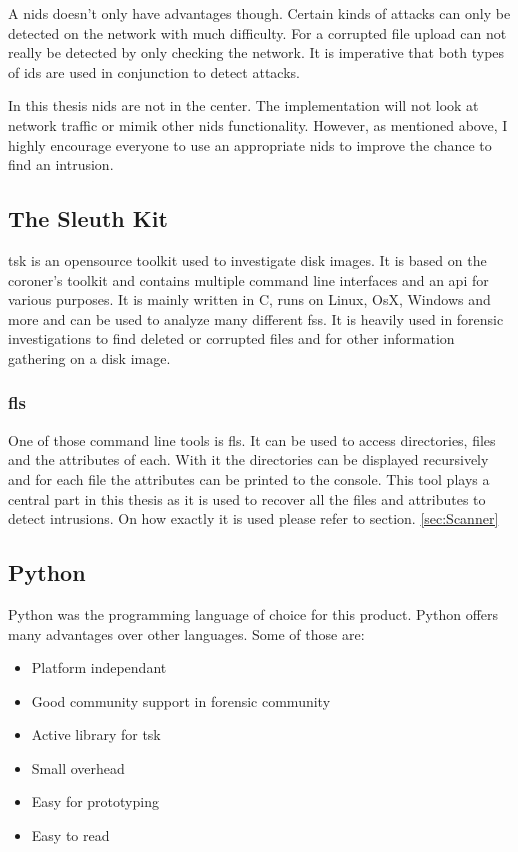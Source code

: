 \documentclass[
	a4paper,					%
	10pt,							%
	twoside,					%
	openright,				%
	notitlepage,			%
	parskip=half,			%
]{scrreprt}					%
\begin{document}
A \gls{nids} doesn't only have advantages though. Certain kinds of attacks can only be detected on the network with much difficulty. For a corrupted file upload can not really be detected by only checking the network. It is imperative that both types of \gls{ids} are used in conjunction to detect attacks. 

In this thesis \gls{nids} are not in the center. The implementation will not look at network traffic or mimik other \gls{nids} functionality. However, as mentioned above, I highly encourage everyone to use an appropriate \gls{nids} to improve the chance to find an intrusion. 

\subsection{The Sleuth Kit}
\label{sec:tsk}

\gls{tsk} is an \gls{opensource} toolkit used to investigate disk images. It is based on the coroner's toolkit \cite{tct} and contains multiple command line interfaces and an \gls{api} for various purposes. \cite{tsk, tsk:about} It is mainly written in C, runs on Linux, OsX, Windows and more and can be used to analyze many different \glspl{fs}. It is heavily used in forensic investigations to find deleted or corrupted files and for other information gathering on a disk image.

\subsubsection{fls}
\label{sec:fls}

One of those command line tools is fls. It can be used to access directories, files and the attributes of each. With it the directories can be displayed recursively and for each file the attributes can be printed to the console. \cite{tsk:fls} This tool plays a central part in this thesis as it is used to recover all the files and attributes to detect intrusions. On how exactly it is used please refer to section. \ref{sec:Scanner}

\subsection{Python}
\label{sec:python}

Python was the programming language of choice for this product. Python offers many advantages over other languages. Some of those are:

\begin{itemize}
	\item Platform independant
	\item Good community support in forensic community
	\item Active library for \gls{tsk}
	\item Small overhead
	\item Easy for prototyping
	\item Easy to read
\end{itemize}
\end{document}
